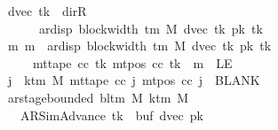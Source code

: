 \begin{isabellebody}
\ \ \ \ \ \ \ \ \ \ \ \ \ dvec\ tk{\isacharprime}{\kern0pt}\ {\isasymnoteq}\ dir{\isachardot}{\kern0pt}R\isanewline
\ \ \ \ \ \ \ \ \ \ \ \ \ \ \ {\isasymLongrightarrow}\ {}\ {\isacharless}{\kern0pt}\ ar{\isacharunderscore}{\kern0pt}disp\ {\isacharparenleft}{\kern0pt}block{\isacharunderscore}{\kern0pt}width\ {\isacharparenleft}{\kern0pt}{\isasymGamma}{\isacharunderscore}{\kern0pt}tm\ M{\isacharparenright}{\kern0pt}{\isacharparenright}{\kern0pt}\ {\isacharparenleft}{\kern0pt}dvec\ tk{\isacharprime}{\kern0pt}{\isacharparenright}{\kern0pt}\ {\isacharparenleft}{\kern0pt}pk{\isacharprime}{\kern0pt}\ tk{\isacharprime}{\kern0pt}{\isacharparenright}{\kern0pt}{\isacharsemicolon}{\kern0pt}\isanewline
\ \ \ \ \ \ \ \ \ \ \ \ \ {\isasymAnd}m{\isachardot}{\kern0pt}\ m\ {\isacharless}{\kern0pt}\ ar{\isacharunderscore}{\kern0pt}disp\ {\isacharparenleft}{\kern0pt}block{\isacharunderscore}{\kern0pt}width\ {\isacharparenleft}{\kern0pt}{\isasymGamma}{\isacharunderscore}{\kern0pt}tm\ M{\isacharparenright}{\kern0pt}{\isacharparenright}{\kern0pt}\ {\isacharparenleft}{\kern0pt}dvec\ tk{\isacharprime}{\kern0pt}{\isacharparenright}{\kern0pt}\ {\isacharparenleft}{\kern0pt}pk{\isacharprime}{\kern0pt}\ tk{\isacharprime}{\kern0pt}{\isacharparenright}{\kern0pt}\isanewline
\ \ \ \ \ \ \ \ \ \ \ \ \ \ \ \ {\isasymLongrightarrow}\ mt{\isacharunderscore}{\kern0pt}tape\ cc\ tk{\isacharprime}{\kern0pt}\ {\isacharparenleft}{\kern0pt}mt{\isacharunderscore}{\kern0pt}pos\ cc\ tk{\isacharprime}{\kern0pt}\ {\isacharminus}{\kern0pt}\ m{\isacharparenright}{\kern0pt}\ {\isasymnoteq}\ LE{}{\isacharsemicolon}{\kern0pt}\isanewline
\ \ \ \ \ \ \ \ \ \ \ \ \ {\isasymforall}j\ {\isasymge}\ k{\isacharunderscore}{\kern0pt}tm\ M{\isachardot}{\kern0pt}\ mt{\isacharunderscore}{\kern0pt}tape\ cc\ j\ {\isacharparenleft}{\kern0pt}mt{\isacharunderscore}{\kern0pt}pos\ cc\ j{\isacharparenright}{\kern0pt}\ {\isacharequal}{\kern0pt}\ BLANK{}{\isacharsemicolon}{\kern0pt}\isanewline
\ \ \ \ \ \ \ \ \ \ \ \ \ ar{\isacharunderscore}{\kern0pt}stage{\isacharunderscore}{\kern0pt}bounded\ {\isacharparenleft}{\kern0pt}bl{\isacharunderscore}{\kern0pt}tm\ M{\isacharparenright}{\kern0pt}\ {\isacharparenleft}{\kern0pt}k{\isacharunderscore}{\kern0pt}tm\ M{\isacharparenright}{\kern0pt}\isanewline
\ \ \ \ \ \ \ \ \ \ \ \ \ \ \ {\isacharparenleft}{\kern0pt}AR{\isacharunderscore}{\kern0pt}SimAdvance{\isacharcomma}{\kern0pt}\ tk{\isacharprime}{\kern0pt}{\isacharcomma}{\kern0pt}\ {}{\isacharcomma}{\kern0pt}\ buf{}{\isacharcomma}{\kern0pt}\ dvec{\isacharcomma}{\kern0pt}\ pk{\isacharprime}{\kern0pt}{\isacharparenright}{\kern0pt}\ {\isasymrbrakk}\isanewline

\end{isabellebody}
